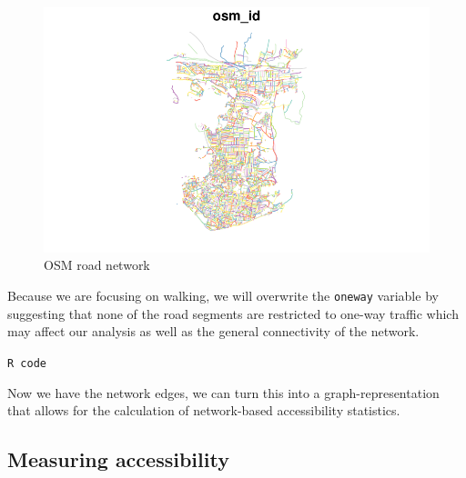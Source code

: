 \documentclass[
  letterpaper,
  DIV=11,
  numbers=noendperiod]{scrreprt}
\newenvironment{Shaded}{\begin{snugshade}}{\end{snugshade}}
\newcommand{\CommentTok}[1]{\textcolor[rgb]{0.37,0.37,0.37}{#1}}
\newcommand{\NormalTok}[1]{\textcolor[rgb]{0.00,0.23,0.31}{#1}}
\newcommand{\OtherTok}[1]{\textcolor[rgb]{0.00,0.23,0.31}{#1}}
\newcommand{\SpecialCharTok}[1]{\textcolor[rgb]{0.37,0.37,0.37}{#1}}
\newcommand{\StringTok}[1]{\textcolor[rgb]{0.13,0.47,0.30}{#1}}
\begin{document}
\begin{figure}[H]

{\centering \includegraphics{02-network_files/figure-pdf/fig-ntx-network-plot-1.pdf}

}

\caption{\label{fig-ntx-network-plot}OSM road network}

\end{figure}

Because we are focusing on walking, we will overwrite the
\texttt{oneway} variable by suggesting that none of the road segments
are restricted to one-way traffic which may affect our analysis as well
as the general connectivity of the network.

\begin{codelisting}

\caption{\texttt{R code}}

\begin{Shaded}
\end{Shaded}

\end{codelisting}

Now we have the network edges, we can turn this into a
graph-representation that allows for the calculation of network-based
accessibility statistics.

\hypertarget{osm}{%
\subsection{Measuring accessibility}\label{osm}}
\end{document}
